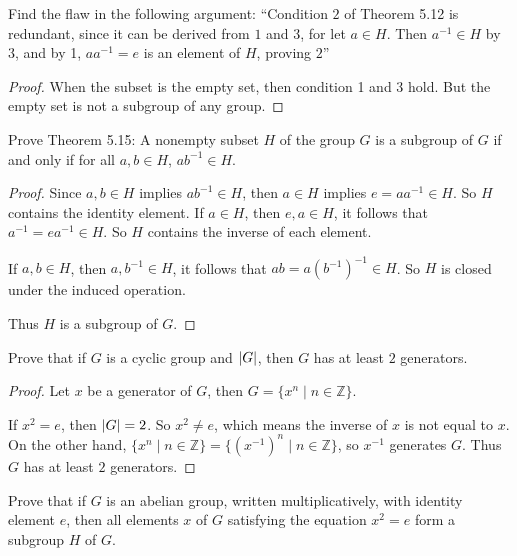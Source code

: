 \begin{exercise}
    Find the flaw in the following argument: ``Condition $2$ of Theorem 5.12 is redundant, since it can be derived from $1$ and $3$, for let $a\in H$. Then $a^{-1}\in H$ by 3, and by 1, $aa^{-1} = e$ is an element of $H$, proving $2$''
\end{exercise}

\begin{proof}
    When the subset is the empty set, then condition 1 and 3 hold. But the empty set is not a subgroup of any group.
\end{proof}

\begin{exercise}
    Prove Theorem 5.15: A nonempty subset $H$ of the group $G$ is a subgroup of $G$ if and only if for all $a, b\in H$, $ab^{-1}\in H$.
\end{exercise}

\begin{proof}
    Since $a, b\in H$ implies $ab^{-1}\in H$, then $a\in H$ implies $e = aa^{-1}\in H$. So $H$ contains the identity element. If $a\in H$, then $e, a\in H$, it follows that $a^{-1} = ea^{-1}\in H$. So $H$ contains the inverse of each element.

    If $a, b\in H$, then $a, b^{-1}\in H$, it follows that $ab = a{(b^{-1})}^{-1} \in H$. So $H$ is closed under the induced operation.

    Thus $H$ is a subgroup of $G$.
\end{proof}

\begin{exercise}
    Prove that if $G$ is a cyclic group and $\left\vert{G}\right\vert$, then $G$ has at least $2$ generators.
\end{exercise}

\begin{proof}
    Let $x$ be a generator of $G$, then $G = \{ x^{n} \mid n\in\mathbb{Z} \}$.

    If $x^{2} = e$, then $\left\vert{G}\right\vert = 2$. So $x^{2} \ne e$, which means the inverse of $x$ is not equal to $x$. On the other hand, $\{ x^{n} \mid n\in\mathbb{Z} \} = \{ {(x^{-1})}^{n} \mid n\in\mathbb{Z} \}$, so $x^{-1}$ generates $G$. Thus $G$ has at least $2$ generators.
\end{proof}

\begin{exercise}
    Prove that if $G$ is an abelian group, written multiplicatively, with identity element $e$, then all elements $x$ of $G$ satisfying the equation $x^{2} = e$ form a subgroup $H$ of $G$.
\end{exercise}

